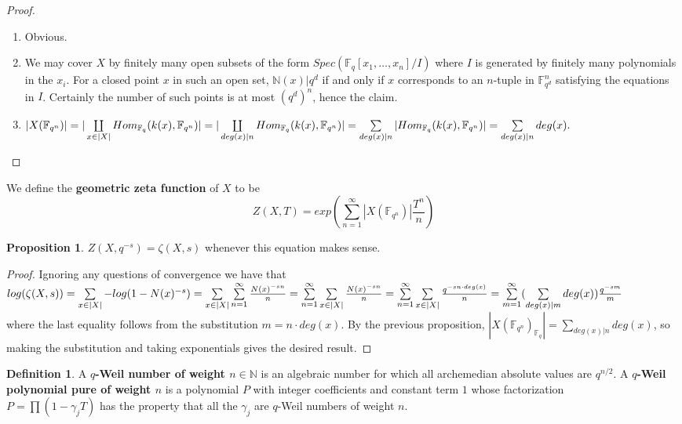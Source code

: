\documentclass{ucbthesis}
\theoremstyle{definition}
\newtheorem{defn}[thm]{Definition}
\theoremstyle{theorem}
\newtheorem{prop}[thm]{Proposition}
\begin{document}
\begin{proof}
\begin{enumerate}
  \item Obvious.
  \item We may cover $X$ by finitely many open subsets of the form $Spec(\mathbb{F}_{q}[x_1,\ldots,x_{n}]/I)$ where $I$ is generated by finitely many polynomials in the $x_{i}$. For a closed point $x$ in such an open set, $\mathbb{N}(x)\vert q^d$ if and only if $x$ corresponds to an $n$-tuple in $\mathbb{F}_{q^d}^n$ satisfying the equations in $I$. Certainly the number of such points is at most $(q^{d})^n$, hence the claim. 
  \item $|X(\mathbb{F}_{q^n})| = |\coprod\limits_{x\in |X|}Hom_{\mathbb{F}_{q}}(k(x),\mathbb{F}_{q^n})|= |\coprod\limits_{deg(x)|n}Hom_{\mathbb{F}_{q}}(k(x),\mathbb{F}_{q^n})| \vspace{5mm}\\ = \sum\limits_{deg(x)|n}|Hom_{\mathbb{F}_{q}}(k(x),\mathbb{F}_{q^n})| = \sum\limits_{deg(x)|n}deg(x).$
\end{enumerate} 
\end{proof}

We define the \textbf{geometric zeta function} of $X$ to be
$$Z(X,T) = exp(\sum\limits_{n=1}^{\infty}|X(\mathbb{F}_{q^n})|\frac{T^{n}}{n})$$

\begin{prop}
$Z(X,q^{-s}) = \zeta(X,s)$ whenever this equation makes sense.
\end{prop}
\begin{proof} Ignoring any questions of convergence we have that\\
$log(\zeta(X,s)) = \sum\limits_{x\in |X|}-log(1-N(x)^{-s}) = \sum\limits_{x\in |X|}\sum\limits_{n=1}^{\infty}\frac{N(x)^{-sn}}{n} = \sum\limits_{n=1}^{\infty}\sum\limits_{x\in |X|}\frac{N(x)^{-sn}}{n}\\ \vspace{.5mm} = \sum\limits_{n=1}^{\infty}\sum\limits_{x\in |X|}\frac{q^{-sn\cdot deg(x)}}{n} = \sum\limits_{m=1}^{\infty}(\sum\limits_{deg(x)|m}deg(x))\frac{q^{-sm}}{m}$\\
where the last equality follows from the substitution $m=n\cdot deg(x)$. By the previous proposition, $|X(\mathbb{F}_{q^n})_{\mathbb{F}_q}| = \sum_{deg(x)|n}deg(x)$, so making the substitution and taking exponentials gives the desired result. 
\end{proof}

\begin{defn} A \textbf{$q$-Weil number of weight $n$}$\in\mathbb{N}$ is an algebraic number for which all archemedian absolute values are $q^{n/2}$. A \textbf{$q$-Weil polynomial pure of weight $n$} is a polynomial $P$ with integer coefficients and constant term $1$ whose factorization\\ $P = \prod(1-\gamma_{j}T)$ has the property that all the $\gamma_{j}$ are $q$-Weil numbers of weight $n$.
\end{defn}
\end{document}

